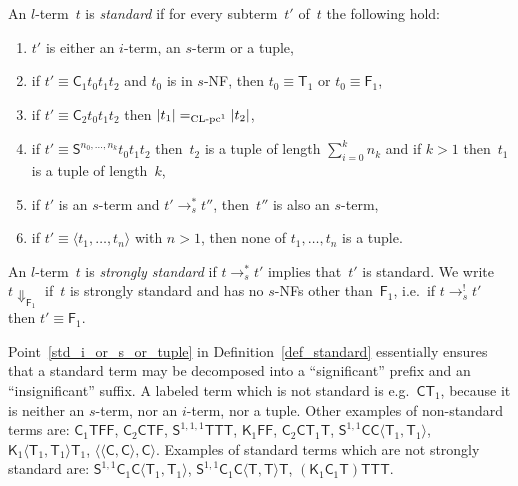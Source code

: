 \documentclass[a4paper,UKenglish]{lipics-v2016}
\newcommand{\Cs}{\mathsf{C}}
\newcommand{\Fs}{\mathsf{F}}
\newcommand{\Ts}{\mathsf{T}}
\newcommand{\Ss}{\mathsf{S}}
\newcommand{\Ks}{\mathsf{K}}
\newcommand{\Da}{\ensuremath{\Downarrow}}
\newcommand{\erase}[1]{\ensuremath{|#1|}}
\newcommand{\la}{\ensuremath{\langle}}
\newcommand{\ra}{\ensuremath{\rangle}}
\newcommand{\sCLC}{{\ensuremath{\text{\rm CL-pc}^1}}}
\begin{document}
\begin{definition}\label{def_standard}
  An $l$-term~$t$ is \emph{standard} if for every subterm~$t'$ of~$t$
  the following hold:
  \begin{enumerate}
  \item\label{std_i_or_s_or_tuple} $t'$ is either an $i$-term, an
    $s$-term or a tuple,
  \item\label{std_c_1} if $t' \equiv \Cs_1 t_0 t_1 t_2$ and $t_0$ is in
    $s$-NF, then $t_0 \equiv \Ts_1$ or $t_0 \equiv \Fs_1$,
  \item\label{std_c_2} if $t' \equiv \Cs_2 t_0 t_1 t_2$ then
    $\erase{t_1} =_{\sCLC} \erase{t_2}$,
  \item\label{std_s} if $t' \equiv \Ss^{n_0,\ldots,n_k} t_0 t_1 t_2$
    then~$t_2$ is a tuple of length $\sum_{i=0}^k n_k$ and if $k > 1$
    then~$t_1$ is a tuple of length~$k$,
  \item\label{std_s_term_reduce} if $t'$ is an $s$-term and
    $t' \to_s^* t''$, then~$t''$ is also an $s$-term,
  \item\label{std_no_nested_tuple} if
    $t' \equiv \la t_1,\ldots,t_n \ra$ with $n > 1$, then none of
    $t_1,\ldots,t_n$ is a tuple.
  \end{enumerate}
  An $l$-term~$t$ is \emph{strongly standard} if $t \to_s^* t'$
  implies that~$t'$ is standard. We write $t\Da_{\Fs_1}$ if~$t$ is
  strongly standard and has no $s$-NFs other than~$\Fs_1$, i.e.~if
  $t \to_s^! t'$ then $t' \equiv \Fs_1$.
\end{definition}

Point~\ref{std_i_or_s_or_tuple} in Definition~\ref{def_standard}
essentially ensures that a standard term may be decomposed into a
``significant'' prefix and an ``insignificant'' suffix. A labeled term
which is not standard is e.g.~$\Cs \Ts_1$, because it is neither an
$s$-term, nor an $i$-term, nor a tuple. Other examples of non-standard
terms are: $\Cs_1 \Ts \Fs \Fs$, $\Cs_2 \Cs \Ts \Fs$,
$\Ss^{1,1,1} \Ts \Ts \Ts$, $\Ks_1 \Fs \Fs$, $\Cs_2 \Cs \Ts_1 \Ts$,
$\Ss^{1,1} \Cs \Cs \la \Ts_1, \Ts_1 \ra$,
$\Ks_1 \la \Ts_1, \Ts_1 \ra \Ts_1$, $\la \la \Cs, \Cs \ra, \Cs
\ra$. Examples of standard terms which are not strongly standard are:
$\Ss^{1,1} \Cs_1 \Cs \la \Ts_1, \Ts_1 \ra$,
$\Ss^{1,1} \Cs_1 \Cs \la \Ts, \Ts \ra \Ts$,
$(\Ks_1 \Cs_1 \Ts) \Ts \Ts \Ts$.
\end{document}
